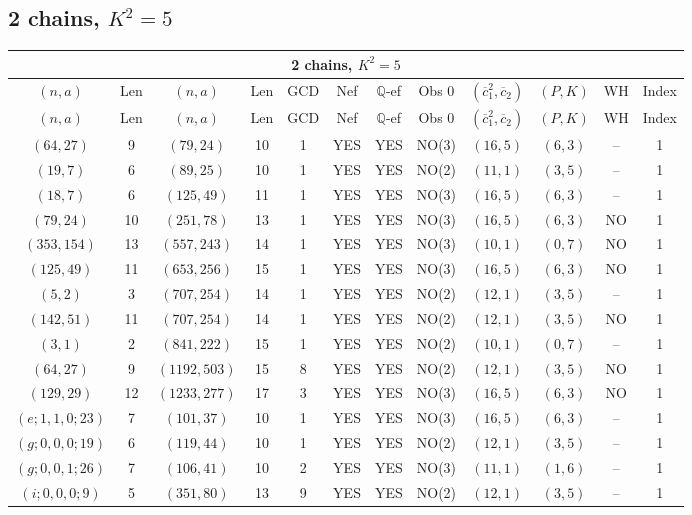 \subsection{2 chains, $K^2 = 5$}
\begin{longtable}{|c|c|c|c|c|c|c|c|c|c|c|c|}
\hline
\multicolumn{12}{|c|}{2 chains, $K^2 = 5$}\\
\hline
$(n,a)$ & Len & $(n,a)$ & Len & GCD & Nef & $\mathbb Q$-ef & Obs 0 & $(\overline c_1^2,\overline c_2)$ & $(P,K)$ & WH & Index\\
\hline
\endfirsthead

\hline
$(n,a)$ & Len & $(n,a)$ & Len & GCD & Nef & $\mathbb Q$-ef & Obs 0 & $(\overline c_1^2,\overline c_2)$ & $(P,K)$ & WH & Index\\
\hline
\endhead
\hline
\endfoot

$(64,27)$ & 9 & $(79,24)$ & 10 & 1 & YES & YES & NO(3) & $(16,5)$ & $(6,3)$ & -- & 1\\
$(19,7)$ & 6 & $(89,25)$ & 10 & 1 & YES & YES & NO(2) & $(11,1)$ & $(3,5)$ & -- & 1\\
$(18,7)$ & 6 & $(125,49)$ & 11 & 1 & YES & YES & NO(3) & $(16,5)$ & $(6,3)$ & -- & 1\\
$(79,24)$ & 10 & $(251,78)$ & 13 & 1 & YES & YES & NO(3) & $(16,5)$ & $(6,3)$ & NO & 1\\
$(353,154)$ & 13 & $(557,243)$ & 14 & 1 & YES & YES & NO(3) & $(10,1)$ & $(0,7)$ & NO & 1\\
$(125,49)$ & 11 & $(653,256)$ & 15 & 1 & YES & YES & NO(3) & $(16,5)$ & $(6,3)$ & NO & 1\\
$(5,2)$ & 3 & $(707,254)$ & 14 & 1 & YES & YES & NO(2) & $(12,1)$ & $(3,5)$ & -- & 1\\
$(142,51)$ & 11 & $(707,254)$ & 14 & 1 & YES & YES & NO(2) & $(12,1)$ & $(3,5)$ & NO & 1\\
$(3,1)$ & 2 & $(841,222)$ & 15 & 1 & YES & YES & NO(2) & $(10,1)$ & $(0,7)$ & -- & 1\\
$(64,27)$ & 9 & $(1192,503)$ & 15 & 8 & YES & YES & NO(2) & $(12,1)$ & $(3,5)$ & NO & 1\\
$(129,29)$ & 12 & $(1233,277)$ & 17 & 3 & YES & YES & NO(3) & $(16,5)$ & $(6,3)$ & NO & 1\\
$(e;1,1,0;23)$ & 7 & $(101,37)$ & 10 & 1 & YES & YES & NO(3) & $(16,5)$ & $(6,3)$ & -- & 1\\
$(g;0,0,0;19)$ & 6 & $(119,44)$ & 10 & 1 & YES & YES & NO(2) & $(12,1)$ & $(3,5)$ & -- & 1\\
$(g;0,0,1;26)$ & 7 & $(106,41)$ & 10 & 2 & YES & YES & NO(3) & $(11,1)$ & $(1,6)$ & -- & 1\\
$(i;0,0,0;9)$ & 5 & $(351,80)$ & 13 & 9 & YES & YES & NO(2) & $(12,1)$ & $(3,5)$ & -- & 1
\end{longtable}
